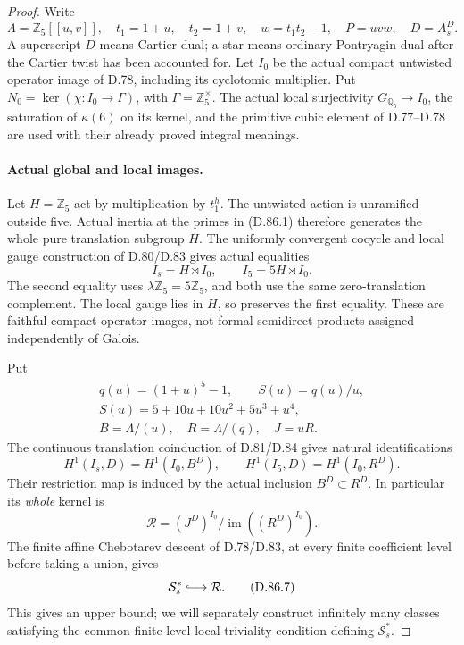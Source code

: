 \begin{proof}
Write
\[
 \Lambda=\mathbb Z_5[[u,v]],\quad t_1=1+u,\quad t_2=1+v,
 \quad w=t_1t_2-1,\quad P=uvw,\quad D=A_s^D.
\]
A superscript \(D\) means Cartier dual; a star means ordinary
Pontryagin dual after the Cartier twist has been accounted for.
Let \(I_0\) be the actual compact untwisted operator image of
D.78, including its cyclotomic multiplier. Put
\(N_0=\ker(\chi:I_0\to\Gamma)\), with
\(\Gamma=\mathbb Z_5^\times\). The actual local surjectivity
\(G_{\mathbb Q_5}\to I_0\), the saturation of \(\kappa(6)\)
on its kernel, and the primitive cubic element of D.77--D.78
are used with their already proved integral meanings.

\paragraph{Actual global and local images.}
Let \(H=\mathbb Z_5\) act by multiplication by \(t_1^h\).
The untwisted action is unramified outside five. Actual inertia
at the primes in (D.86.1) therefore generates the whole pure
translation subgroup \(H\). The uniformly convergent cocycle
and local gauge construction of D.80/D.83 gives actual equalities
\[
              I_s=H\rtimes I_0,
       \qquad I_5=5H\rtimes I_0.                       \tag{D.86.3}
\]
The second equality uses \(\lambda\mathbb Z_5=5\mathbb Z_5\),
and both use the same zero-translation complement. The local
gauge lies in \(H\), so preserves the first equality. These
are faithful compact operator images, not formal semidirect
products assigned independently of Galois.

Put
\[
 \begin{gathered}
 q(u)=(1+u)^5-1,\qquad S(u)=q(u)/u,\\
 S(u)=5+10u+10u^2+5u^3+u^4,\\
 B=\Lambda/(u),\quad R=\Lambda/(q),\quad J=uR.
 \end{gathered}
                                                               \tag{D.86.4}
\]
The continuous translation coinduction of D.81/D.84 gives
natural identifications
\[
 H^1(I_s,D)=H^1(I_0,B^D),\qquad
 H^1(I_5,D)=H^1(I_0,R^D).                               \tag{D.86.5}
\]
Their restriction map is induced by the actual inclusion
\(B^D\subset R^D\). In particular its \emph{whole} kernel is
\[
 \mathcal R=(J^D)^{I_0}/\operatorname{im}((R^D)^{I_0}). \tag{D.86.6}
\]
The finite affine Chebotarev descent of D.78/D.83, at every
finite coefficient level before taking a union, gives
\[
                         \mathcal S_s^*\lhook\joinrel\longrightarrow
                         \mathcal R.                  \tag{D.86.7}
\]
This gives an upper bound; we will separately construct
infinitely many classes satisfying the common finite-level
local-triviality condition defining \(\mathcal S_s^*\).


\end{proof}
